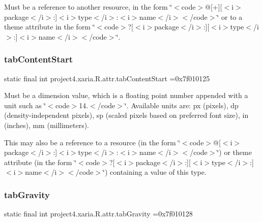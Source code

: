 Must be a reference to another resource, in the form \char`\"{}$<$code$>$@\mbox{[}+\mbox{]}\mbox{[}$<$i$>$package$<$/i$>$\+:\mbox{]}$<$i$>$type$<$/i$>$\+:$<$i$>$name$<$/i$>$$<$/code$>$\char`\"{} or to a theme attribute in the form \char`\"{}$<$code$>$?\mbox{[}$<$i$>$package$<$/i$>$\+:\mbox{]}\mbox{[}$<$i$>$type$<$/i$>$\+:\mbox{]}$<$i$>$name$<$/i$>$$<$/code$>$\char`\"{}. \mbox{\label{classproject4_1_1xaria_1_1R_1_1attr_ae7905de25c9cb3a96a14252cdf14fe08}} 
\subsubsection{\texorpdfstring{tab\+Content\+Start}{tabContentStart}}
{\footnotesize\ttfamily static final int project4.\+xaria.\+R.\+attr.\+tab\+Content\+Start =0x7f010125\hspace{0.3cm}{\ttfamily [static]}}

Must be a dimension value, which is a floating point number appended with a unit such as \char`\"{}$<$code$>$14.\+5sp$<$/code$>$\char`\"{}. Available units are\+: px (pixels), dp (density-\/independent pixels), sp (scaled pixels based on preferred font size), in (inches), mm (millimeters). 

This may also be a reference to a resource (in the form \char`\"{}$<$code$>$@\mbox{[}$<$i$>$package$<$/i$>$\+:\mbox{]}$<$i$>$type$<$/i$>$\+:$<$i$>$name$<$/i$>$$<$/code$>$\char`\"{}) or theme attribute (in the form \char`\"{}$<$code$>$?\mbox{[}$<$i$>$package$<$/i$>$\+:\mbox{]}\mbox{[}$<$i$>$type$<$/i$>$\+:\mbox{]}$<$i$>$name$<$/i$>$$<$/code$>$\char`\"{}) containing a value of this type. \mbox{\label{classproject4_1_1xaria_1_1R_1_1attr_a2e43bd5aca4df19086f112ad7a62fec2}} 
\subsubsection{\texorpdfstring{tab\+Gravity}{tabGravity}}
{\footnotesize\ttfamily static final int project4.\+xaria.\+R.\+attr.\+tab\+Gravity =0x7f010128\hspace{0.3cm}{\ttfamily [static]}}

